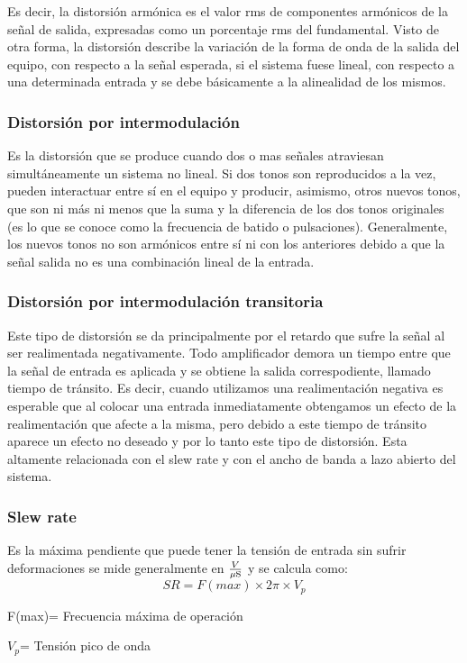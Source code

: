 Es decir, la distorsión armónica es el valor rms de componentes armónicos de la señal de salida, expresadas como un porcentaje rms del fundamental.
Visto de otra forma, la distorsión describe la variación de la forma de onda de la salida del equipo, con respecto a la señal esperada, si el sistema fuese lineal, con respecto a una determinada entrada y se debe básicamente a la alinealidad de los mismos.
\medskip 
\subsubsection{Distorsión por intermodulación}


Es la distorsión que se produce cuando dos o mas señales atraviesan simultáneamente un sistema no lineal. Si dos tonos son reproducidos a la vez, pueden interactuar entre sí en el equipo y producir, asimismo, otros nuevos tonos, que son ni más ni menos que la suma y la diferencia de los dos tonos originales (es lo que se conoce como la frecuencia de batido o pulsaciones). Generalmente, los nuevos tonos no son armónicos entre sí ni con los anteriores debido a que la señal salida no es una combinación lineal de la entrada.
\medskip 
\subsubsection{Distorsión por intermodulación transitoria}


Este tipo de distorsión se da principalmente por el retardo que sufre la señal al ser realimentada negativamente. Todo amplificador demora un tiempo entre que la señal de entrada es aplicada y se obtiene la salida correspodiente, llamado tiempo de tránsito. Es decir, cuando utilizamos una realimentación negativa es esperable que al colocar una entrada inmediatamente obtengamos un efecto de la realimentación que afecte a la misma, pero debido a este tiempo de tránsito aparece un efecto no deseado y por lo tanto este tipo de distorsión. Esta altamente relacionada con el slew rate y con el ancho de banda a lazo abierto del sistema. 
\medskip 
\subsubsection{Slew rate}
	
Es la máxima pendiente que puede tener la tensión de entrada sin sufrir deformaciones se mide generalmente en $\frac{V}{\mu\mbox{s}}$ y se calcula como:
\begin{equation}
SR = F(max) \times 2\pi \times V_p
\end{equation}
\begin{description}
\item F(max)= Frecuencia máxima de operación
\item  $V_p$= Tensión pico de onda
\end{description}
\medskip 
